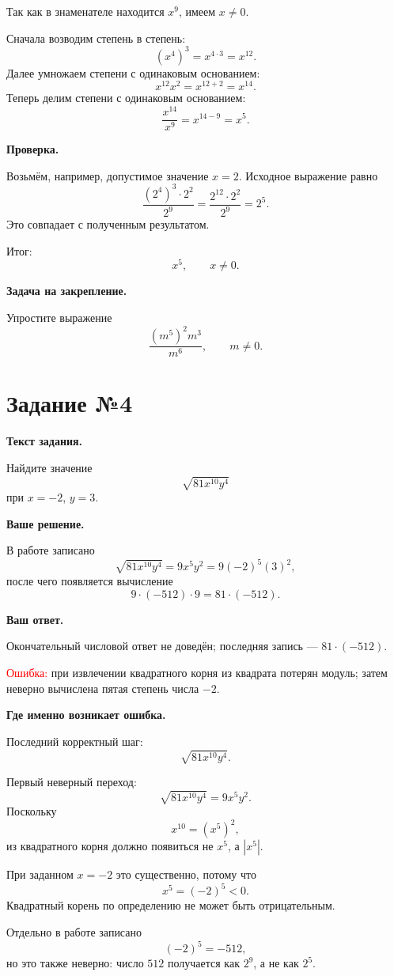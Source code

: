 \documentclass[12pt,a4paper]{article}
\begin{document}
Так как в знаменателе находится $x^9$, имеем $x\ne0$.

Сначала возводим степень в степень:
\[
(x^4)^3=x^{4\cdot3}=x^{12}.
\]
Далее умножаем степени с одинаковым основанием:
\[
x^{12}x^2=x^{12+2}=x^{14}.
\]
Теперь делим степени с одинаковым основанием:
\[
\frac{x^{14}}{x^9}=x^{14-9}=x^5.
\]

\textbf{Проверка.}

Возьмём, например, допустимое значение $x=2$. Исходное выражение равно
\[
\frac{(2^4)^3\cdot2^2}{2^9}
=
\frac{2^{12}\cdot2^2}{2^9}
=
2^5.
\]
Это совпадает с полученным результатом.

\textcolor{teal!60!black}{Итог:}
\[
\boxed{x^5},\qquad x\ne0.
\]

\textbf{Задача на закрепление.}

Упростите выражение
\[
\frac{(m^5)^2m^3}{m^6},\qquad m\ne0.
\]

\newpage
{}
\label{task:4}
\section*{Задание №4}

\textbf{Текст задания.}

Найдите значение
\[
\sqrt{81x^{10}y^4}
\]
при $x=-2$, $y=3$.

\textbf{Ваше решение.}

В работе записано
\[
\sqrt{81x^{10}y^4}
=
9x^5y^2
=
9(-2)^5(3)^2,
\]
после чего появляется вычисление
\[
9\cdot(-512)\cdot9=81\cdot(-512).
\]

\textbf{Ваш ответ.}

Окончательный числовой ответ не доведён; последняя запись --- $81\cdot(-512)$.

\textcolor{red}{Ошибка:} при извлечении квадратного корня из квадрата потерян модуль; затем неверно вычислена пятая степень числа $-2$.

\textbf{Где именно возникает ошибка.}

Последний корректный шаг:
\[
\sqrt{81x^{10}y^4}.
\]

Первый неверный переход:
\[
\sqrt{81x^{10}y^4}=9x^5y^2.
\]
Поскольку
\[
x^{10}=(x^5)^2,
\]
из квадратного корня должно появиться не $x^5$, а $|x^5|$.

При заданном $x=-2$ это существенно, потому что
\[
x^5=(-2)^5<0.
\]
Квадратный корень по определению не может быть отрицательным.

Отдельно в работе записано
\[
(-2)^5=-512,
\]
но это также неверно: число $512$ получается как $2^9$, а не как $2^5$.
\end{document}
